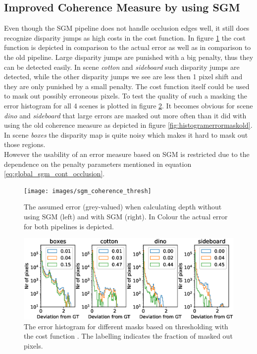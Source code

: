 \documentclass  [
  paper    = a4,
  BCOR     = 10mm,
  twoside,
  fontsize = 12pt,
  fleqn,
  toc      = bibnumbered,
  toc      = listofnumbered,
  numbers  = noendperiod,
  headings = normal,
  listof   = leveldown,
  version  = 3.03
]                                       {scrreprt}
\begin{document}
\subsection*{Improved Coherence Measure by using SGM}
Even though the SGM pipeline does not handle occlusion edges well, it still does recognize disparity jumps as high costs in the cost function. In figure \ref{fig:sgmcoherencethresh} the cost function is depicted in comparison to the actual error as well as in comparison to the old pipeline. Large disparity jumps are punished with a big penalty, thus they can be detected easily. In scene \textit{cotton} and \textit{sideboard} such disparity jumps are detected, while the other disparity jumps we see are less then 1 pixel shift and they are only punished by a small penalty. The cost function itself could be used to mask out possibly erroneous pixels. To test the quality of such a masking the error histogram for all 4 scenes is plotted in figure \ref{fig:histogramerrormasksgm}. It becomes obvious for scene \textit{dino} and \textit{sideboard} that large errors are masked out more often than it did with using the old coherence measure as depicted in figure \ref{fig:histogramerrormaskold}. In scene \textit{boxes} the disparity map is quite noisy which makes it hard to mask out those regions.\\
 However the usability of an error measure based on SGM is restricted due to the dependence on the penalty parameters mentioned in equation \ref{eq:global_sgm_cont_occlusion}.

\begin{figure}
	\centering
	\texttt{[image: images/sgm\_coherence\_thresh]}
	\caption[SGM Coherence measure]{The assumed error (grey-valued) when calculating depth without using SGM (left) and with SGM (right). In Colour the actual error for both pipelines is depicted.}
	\label{fig:sgmcoherencethresh}
\end{figure}



\begin{figure}
	\centering
	\includegraphics[width=1\linewidth]{images/histogram_error_mask_sgm}
	\caption[Histogram when masking errors with new error map]{The error histogram for different masks based on thresholding with the cost function . The labelling indicates the fraction of masked out pixels.}
	\label{fig:histogramerrormasksgm}
\end{figure}
\end{document}
